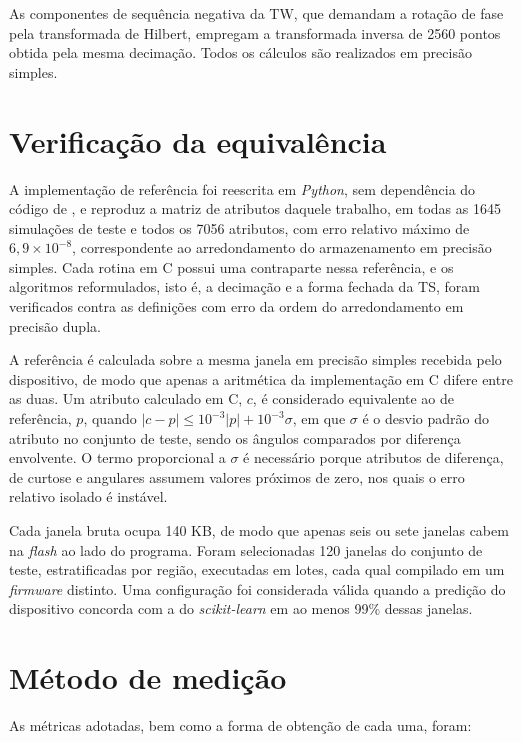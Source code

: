 \documentclass[
	12pt,				%
	openright,			%
	oneside,			%
	a4paper,			%
	english,			%
	brazil,				%
	]{abntex2}
\begin{document}
As componentes de sequência negativa da TW, que demandam a rotação de fase pela transformada de Hilbert, empregam a transformada inversa de 2560 pontos obtida pela mesma decimação. Todos os cálculos são realizados em precisão simples.

\section{Verificação da equivalência}
\label{sec:verificacao}
A implementação de referência foi reescrita em \textit{Python}, sem dependência do código de , e reproduz a matriz de atributos daquele trabalho, em todas as 1645 simulações de teste e todos os 7056 atributos, com erro relativo máximo de $6{,}9 \times 10^{-8}$, correspondente ao arredondamento do armazenamento em precisão simples. Cada rotina em C possui uma contraparte nessa referência, e os algoritmos reformulados, isto é, a decimação e a forma fechada da TS, foram verificados contra as definições com erro da ordem do arredondamento em precisão dupla.

A referência é calculada sobre a mesma janela em precisão simples recebida pelo dispositivo, de modo que apenas a aritmética da implementação em C difere entre as duas. Um atributo calculado em C, $c$, é considerado equivalente ao de referência, $p$, quando $|c - p| \leq 10^{-3}|p| + 10^{-3}\sigma$, em que $\sigma$ é o desvio padrão do atributo no conjunto de teste, sendo os ângulos comparados por diferença envolvente. O termo proporcional a $\sigma$ é necessário porque atributos de diferença, de curtose e angulares assumem valores próximos de zero, nos quais o erro relativo isolado é instável.

Cada janela bruta ocupa 140 KB, de modo que apenas seis ou sete janelas cabem na \textit{flash} ao lado do programa. Foram selecionadas 120 janelas do conjunto de teste, estratificadas por região, executadas em lotes, cada qual compilado em um \textit{firmware} distinto. Uma configuração foi considerada válida quando a predição do dispositivo concorda com a do \textit{scikit-learn} em ao menos 99\% dessas janelas.

\section{Método de medição}
\label{sec:medicao}
As métricas adotadas, bem como a forma de obtenção de cada uma, foram:
\end{document}
